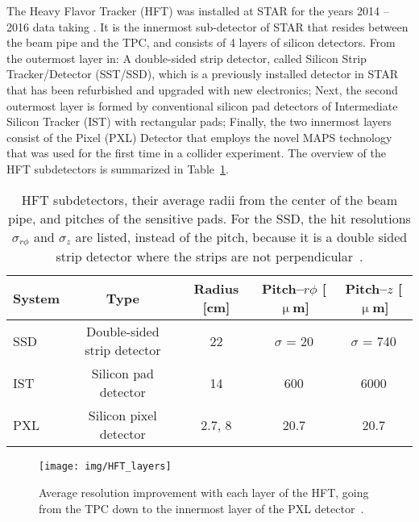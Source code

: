 The Heavy Flavor Tracker (HFT) was installed at STAR for the years 2014 -- 2016 data 
taking \cite{HftTdr, HFTLeo, HftFinal}. It is the innermost 
sub-detector of STAR that resides between the beam pipe and the TPC, and consists of 4
layers of silicon detectors. From the outermost layer in: A double-sided strip detector, called Silicon Strip
Tracker/Detector
(SST/SSD), which is a previously installed detector in STAR that has been
refurbished and upgraded with new electronics; Next, the second outermost layer is formed by conventional silicon 
pad detectors
of Intermediate Silicon Tracker (IST) 
with rectangular pads; Finally, the two innermost layers consist of the Pixel (PXL) 
Detector
that employs the novel MAPS technology that was used for the first time in a collider experiment. The overview of the 
HFT
subdetectors is summarized in Table~\ref{HFTtab}.

\begin{table}[htb]
\caption{\label{HFTtab}HFT subdetectors, their average radii from the center of the beam pipe, and pitches of the sensitive pads. For the SSD, the hit resolutions $\sigma_{r\phi}$ and $\sigma_z$ are listed, instead of the pitch, because it is a double sided strip detector where the strips are not perpendicular~\cite{HftTdr}.}
\begin{center}
\begin{tabular}{lcccc}
\toprule
System & Type & Radius [cm] & Pitch--$r\phi$ [$\upmu$m] & Pitch--$z$ [$\upmu$m]\\
\midrule
SSD & Double-sided strip detector & 22 & $\sigma$ = 20 & $\sigma$ = 740 \\
IST & Silicon pad detector & 14 & 600 & 6000 \\
PXL & Silicon pixel detector & 2.7, 8 & 20.7 & 20.7 \\
\bottomrule
\end{tabular}
\end{center}
\end{table}


\begin{figure}[!htb]
\begin{center}
 \texttt{[image: img/HFT\_layers]}\\
\end{center}
\caption{\label{HFT_layers}Average resolution improvement with each layer of the HFT, going from the TPC down to the innermost layer of the PXL detector~\cite{KubaVyzkumak}.}
\end{figure}



